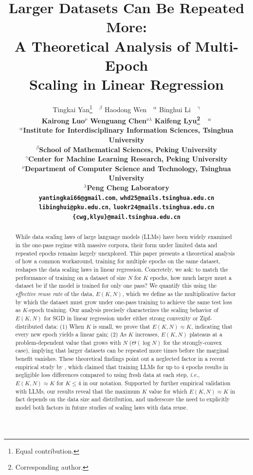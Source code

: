 \documentclass{article} %
\title{Larger Datasets Can Be Repeated More: \\ A Theoretical Analysis of Multi-Epoch \\ Scaling in Linear Regression}
\author{
Tingkai Yan\thanks{Equal contribution.}~~$^{\beta}$
\quad Haodong Wen\footnotemark[1]~~$^{\alpha}$
\quad  
Binghui Li\footnotemark[1]~~$^{\gamma}$
\quad \\
\bf Kairong Luo$^\nu$ 
\quad
Wenguang Chen$^{\nu\lambda}$ 
\quad
Kaifeng Lyu\thanks{Corresponding author.}~~$^{\alpha}$\\
$^\alpha$Institute for Interdisciplinary Information Sciences, Tsinghua University\\
$^\beta$School of Mathematical Sciences, Peking University\\
$^\gamma$Center for Machine Learning Research, Peking University \\
$^\nu$Department of Computer Science and Technology, Tsinghua University\\
$^\lambda$Peng Cheng Laboratory\\
\texttt{yantingkai66@gmail.com}, \quad \texttt{whd25@mails.tsinghua.edu.cn} \\
\texttt{libinghui@pku.edu.cn}, \quad \texttt{luokr24@mails.tsinghua.edu.cn}\\
\texttt{\{cwg,klyu\}@mail.tsinghua.edu.cn}
}
\begin{document}
\maketitle

\begin{abstract}
    While data scaling laws of large language models (LLMs) have been widely examined in the one-pass regime with massive corpora,
    their form under limited data and repeated epochs remains largely unexplored.
    This paper presents a theoretical analysis of how a common workaround, training for multiple epochs on the same dataset, reshapes the data scaling laws in linear regression.
    Concretely, we ask: to match the performance of training on a dataset of size $N$ for $K$ epochs, how much larger must a dataset be if the model is trained for only one pass?
    We quantify this using the \textit{effective reuse rate} of the data, $E(K, N)$, which we define as the multiplicative factor by which the dataset must grow under one-pass training to achieve the same test loss as $K$-epoch training.
    Our analysis precisely characterizes the scaling behavior of $E(K, N)$ for SGD in linear regression under either strong convexity or Zipf-distributed data: (1) When $K$ is small, we prove that $E(K, N) \approx K$, indicating that every new epoch yields a linear gain; (2) As $K$ increases, $E(K, N)$ plateaus at a problem-dependent value that grows with $N$ ($\Theta(\log N)$ for the strongly-convex case), implying that larger datasets can be repeated more times before the marginal benefit vanishes.
    These theoretical findings point out a neglected factor in a recent empirical study by \citet{muennighoff2023scaling}, which claimed that training LLMs for up to $4$ epochs results in negligible loss differences compared to using fresh data at each step, \textit{i.e.}, $E(K, N) \approx K$ for $K \le 4$ in our notation. 
    Supported by further empirical validation with LLMs,
    our results reveal that the maximum $K$ value for which $E(K, N) \approx K$ in fact depends on the data size and distribution, 
    and underscore the need to explicitly model both factors in future studies of scaling laws with data reuse.


\end{abstract}
\end{document}
